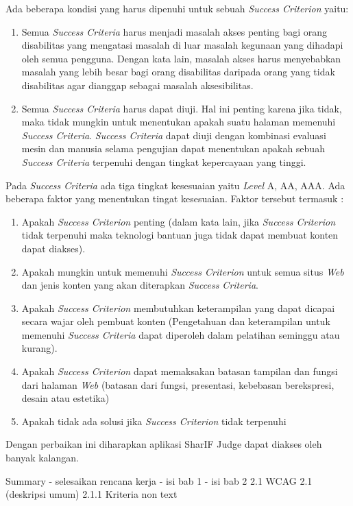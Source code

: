 \documentclass[a4paper,twoside]{article}
\begin{document}
Ada beberapa kondisi yang harus dipenuhi untuk sebuah \textit{Success Criterion} yaitu:
\begin{enumerate}
	\item Semua \textit{Success Criteria} harus menjadi masalah akses penting bagi orang disabilitas yang mengatasi masalah di luar masalah kegunaan yang dihadapi oleh semua pengguna. Dengan kata lain, masalah akses harus menyebabkan masalah yang lebih besar bagi orang disabilitas daripada orang yang tidak disabilitas agar dianggap sebagai masalah aksesibilitas.
	\item Semua \textit{Success Criteria} harus dapat diuji. Hal ini penting karena jika tidak, maka tidak mungkin untuk menentukan apakah suatu halaman memenuhi \textit{Success Criteria}. \textit{Success Criteria} dapat diuji dengan kombinasi evaluasi mesin dan manusia selama pengujian dapat menentukan apakah sebuah \textit{Success Criteria} terpenuhi dengan tingkat kepercayaan yang tinggi.
\end{enumerate}

Pada \textit{Success Criteria} ada tiga tingkat kesesuaian yaitu \textit{Level} A, AA, AAA. Ada beberapa faktor yang menentukan tingat kesesuaian. Faktor tersebut termasuk :
\begin{enumerate}
	\item Apakah \textit{Success Criterion} penting (dalam kata lain, jika \textit{Success Criterion} tidak terpenuhi maka teknologi bantuan juga tidak dapat membuat konten dapat diakses).
	\item Apakah mungkin untuk memenuhi \textit{Success Criterion} untuk semua situs \textit{Web} dan jenis konten yang akan diterapkan \textit{Success Criteria}.
	\item Apakah \textit{Success Criterion} membutuhkan keterampilan yang dapat dicapai secara wajar oleh pembuat konten (Pengetahuan dan keterampilan untuk memenuhi \textit{Success Criteria} dapat diperoleh dalam pelatihan seminggu atau kurang).
	\item Apakah \textit{Success Criterion} dapat memaksakan batasan tampilan dan fungsi dari halaman \textit{Web} (batasan dari fungsi, presentasi, kebebasan berekspresi, desain atau estetika)
	\item Apakah tidak ada solusi jika \textit{Success Criterion} tidak terpenuhi
\end{enumerate}

Dengan perbaikan ini diharapkan aplikasi SharIF Judge dapat diakses oleh banyak kalangan.

Summary
- selesaikan rencana kerja
- isi bab 1
- isi bab 2
	2.1 WCAG 2.1 (deskripsi umum) 
		2.1.1 Kriteria non text
\end{document}
